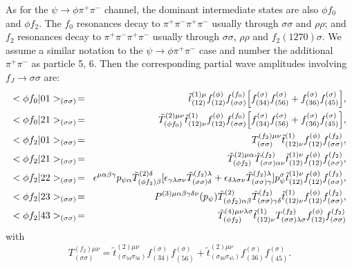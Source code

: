 As for the $\psi\to\phi\pi^+\pi^-$ channel, the dominant
intermediate states are also $\phi f_0$ and $\phi f_2$. The $f_0$
resonances decay to $\pi^+\pi^-\pi^+\pi^-$ usually through
$\sigma\sigma$ and $\rho\rho$; and $f_2$ resonances decay to
$\pi^+\pi^-\pi^+\pi^-$ usually through $\sigma\sigma$, $\rho\rho$
and $f_2(1270)\sigma$. We assume a similar notation to the
$\psi\to\phi\pi^+\pi^-$ case and number the additional
$\pi^+\pi^-$ as particle 5, 6. Then the corresponding partial wave
amplitudes involving $f_J\to \sigma\sigma$ are:
\begin{eqnarray}
<\phi f_0|01>_{(\sigma\sigma)} \!&=&\! \tilde t^{(1)\mu}_{(12)}
f_{(12)}^{(\phi)}f_{(\sigma\sigma)}^{(f_0)}
\Bigl[f^{(\sigma)}_{(34)}f^{(\sigma)}_{(56)}
+f^{(\sigma)}_{(36)}f^{(\sigma)}_{(45)}\Bigr],\\
<\phi f_0|21>_{(\sigma\sigma)} \!&=&\! \tilde T^{(2)\mu\nu}_{(\phi
f_0)} \tilde t^{(1)}_{(12)\nu} f_{(12)}^{(\phi)}
f_{(\sigma\sigma)}^{(f_0)}
\Bigl[f^{(\sigma)}_{(34)}f^{(\sigma)}_{(56)}
+f^{(\sigma)}_{(36)}f^{(\sigma)}_{(45)}\Bigr], \\
<\phi f_2|01>_{(\sigma\sigma)} \!&=&\!
T^{(f_2)\mu\nu}_{(\sigma\sigma)}
\tilde t^{(1)}_{(12)\nu} f_{(12)}^{(\phi)}f_{(\sigma\sigma)}^{(f_2)} , \\
<\phi f_2|21>_{(\sigma\sigma)} \!&=&\! \tilde
T^{(2)\mu\alpha}_{(\phi f_2)} \tilde
T^{(f_2)}_{(\sigma\sigma)\alpha\nu}\tilde t^{(1)\nu}_{(12)}
f_{(12)}^{(\phi)} f_{(\sigma\sigma)}^{(f_2)}, \\
<\phi f_2|22>_{(\sigma\sigma)} \!&=&\!
\epsilon^{\mu\alpha\beta\gamma} p_{\psi\alpha} \tilde
T^{(2)\delta}_{(\phi f_2)\beta} [\epsilon_{\gamma\lambda\sigma\nu}
\tilde T^{(f_2)\lambda}_{(\sigma\sigma)\delta}
+\epsilon_{\delta\lambda\sigma\nu} \tilde
T^{(f_2)\lambda}_{(\sigma\sigma)\gamma}]p_\psi^\sigma \tilde
t^{(1)\nu}_{(12)}
f_{(12)}^{(\phi)}f_{(\sigma\sigma)}^{(f_2)}, \\
<\phi f_2|23>_{(\sigma\sigma)} \!&=&\!
P^{(3)\mu\alpha\beta\gamma\delta\nu}(p_\psi) \tilde T^{(2)}_{(\phi
f_2)\alpha\beta} \tilde T^{(f_2)}_{(\sigma\sigma)\gamma\delta}
\tilde t^{(1)}_{(12)\nu}
f_{(12)}^{(\phi)}f_{(\sigma\sigma)}^{(f_2)}, \\
<\phi f_2|43>_{(\sigma\sigma)} \!&=&\! \tilde
T^{(4)\mu\nu\lambda\sigma}_{(\phi f_2)}
        \tilde t^{(1)}_{(12)\nu} T^{(f_2)}_{(\sigma\sigma)\lambda\sigma}
        f_{(12)}^{(\phi)}f_{(\sigma\sigma)}^{(f_2)}
\end{eqnarray}
with
\begin{equation}
T^{(f_2)\mu\nu}_{(\sigma\sigma)}=\tilde
t^{(2)\mu\nu}_{(\sigma_{34}\sigma_{56})}
f^{(\sigma)}_{(34)}f^{(\sigma)}_{(56)} + \tilde
t^{(2)\mu\nu}_{(\sigma_{36}\sigma_{45})}
f^{(\sigma)}_{(36)}f^{(\sigma)}_{(45)} .
\end{equation}
